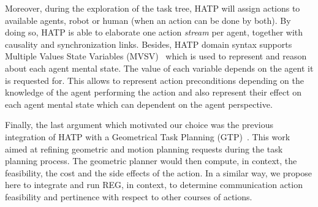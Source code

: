 \documentclass[a4paper,11pt,twoside]{StyleThese}
\begin{document}
Moreover, during the exploration of the task tree, HATP will assign actions to available agents, robot or human (when an action can be done by both). By doing so, HATP is able to elaborate one action \textit{stream} per agent, together with causality and synchronization links. 
Besides, HATP domain syntax supports Multiple Values State Variables (MVSV)~\cite{guitton2012belief} which is used to represent and reason about each agent mental state. The value of each variable depends on the agent it is requested for. This allows to represent action preconditions depending on the knowledge of the agent performing the action and also represent their effect on each agent mental state which can dependent on the agent perspective.

Finally, the last argument which motivated our choice was the previous integration of HATP  with a  Geometrical Task Planning (GTP)~\cite{gharbi2015combining}. This work aimed at refining geometric and motion planning requests during the task planning process. The geometric planner would then compute, in context, the feasibility, the cost and the side effects of the action. In a similar way, we propose here to integrate and run REG, in context, to determine communication action feasibility and pertinence with respect to other courses of actions.

\end{document}
